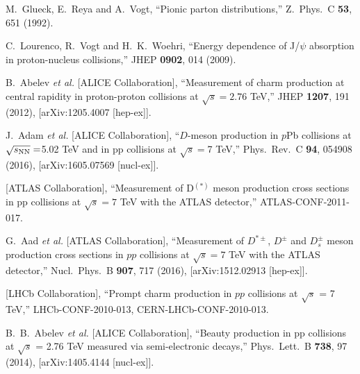\documentclass[12pt,a4paper,final]{iopart} %
\begin{document}
\begin{thebibliography}{100}
  M.~Glueck, E.~Reya and A.~Vogt,
  ``Pionic parton distributions,''
  Z.\ Phys.\ C {\bf 53}, 651 (1992).

  C.~Lourenco, R.~Vogt and H.~K.~Woehri,
  ``Energy dependence of J/$\psi$ absorption in proton-nucleus collisions,''
  JHEP {\bf 0902}, 014 (2009).










  



  B.~Abelev {\it et al.} [ALICE Collaboration],
  ``Measurement of charm production at central rapidity in proton-proton collisions at $\sqrt{s}=2.76$ TeV,''
  JHEP {\bf 1207}, 191 (2012),
  [arXiv:1205.4007 [hep-ex]].
  
  J.~Adam {\it et al.} [ALICE Collaboration],
  ``$D$-meson production in $p$Pb collisions at $\sqrt{s_{\rm NN}}=$5.02 TeV and in pp collisions at $\sqrt{s}=$7 TeV,''
  Phys.\ Rev.\ C {\bf 94}, 054908 (2016),
  [arXiv:1605.07569 [nucl-ex]].
  
  [ATLAS Collaboration],
  ``Measurement of D$^(*)$ meson production cross sections in pp collisions at $ \sqrt{s}=7$ TeV with the ATLAS detector,''
  ATLAS-CONF-2011-017.
 
  G.~Aad {\it et al.} [ATLAS Collaboration],
  ``Measurement of $D^{*\pm}$, $D^\pm$ and $D_s^\pm$ meson production cross sections in $pp$ collisions at $\sqrt{s}=7$ TeV with the ATLAS detector,''
  Nucl.\ Phys.\ B {\bf 907}, 717 (2016),
  [arXiv:1512.02913 [hep-ex]].
 


  [LHCb Collaboration],
  ``Prompt charm production in $pp$ collisions at $\sqrt{s}$ = 7 TeV,''
  LHCb-CONF-2010-013, CERN-LHCb-CONF-2010-013.
  



  B.~B.~Abelev {\it et al.} [ALICE Collaboration],
  ``Beauty production in pp collisions at $\sqrt{s}$ = 2.76 TeV measured via semi-electronic decays,''
  Phys.\ Lett.\ B {\bf 738}, 97 (2014),
  [arXiv:1405.4144 [nucl-ex]].



\end{thebibliography}
\end{document}

